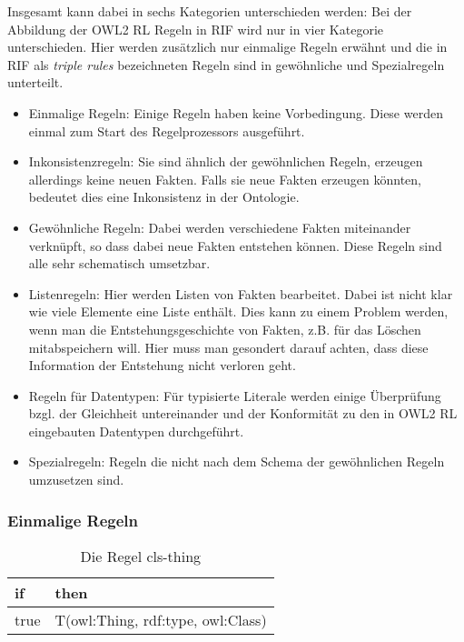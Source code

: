 Insgesamt kann dabei in sechs Kategorien unterschieden werden:
Bei der Abbildung der OWL2 RL Regeln in RIF \cite{Reynolds2009} wird nur in vier Kategorie unterschieden. Hier werden zusätzlich nur einmalige Regeln erwähnt und die in RIF als \emph{triple rules} bezeichneten Regeln sind in gewöhnliche und Spezialregeln unterteilt.
\begin{itemize}
  \item Einmalige Regeln: Einige Regeln haben keine Vorbedingung. Diese werden einmal zum Start des Regelprozessors ausgeführt.
  \item Inkonsistenzregeln: Sie sind ähnlich der gewöhnlichen Regeln, erzeugen allerdings keine neuen Fakten. Falls sie neue Fakten erzeugen könnten, bedeutet dies eine Inkonsistenz in der Ontologie.
  \item Gewöhnliche Regeln: Dabei werden verschiedene Fakten miteinander verknüpft, so dass dabei neue Fakten entstehen können. Diese Regeln sind alle sehr schematisch umsetzbar.
  \item Listenregeln: Hier werden Listen von Fakten bearbeitet. Dabei ist nicht klar wie viele Elemente eine Liste enthält. Dies kann zu einem Problem werden, wenn man die Entstehungsgeschichte von Fakten, z.B. für das Löschen mitabspeichern will. Hier muss man gesondert darauf achten, dass diese Information der Entstehung nicht verloren geht.
  \item Regeln für Datentypen: Für typisierte Literale werden einige Überprüfung bzgl. der Gleichheit untereinander und der Konformität zu den in OWL2 RL eingebauten Datentypen durchgeführt.
  \item Spezialregeln: Regeln die nicht nach dem Schema der gewöhnlichen Regeln umzusetzen sind.

\end{itemize}

\subsubsection{Einmalige Regeln}

\begin{table}[htb]
\begin{center}
	\begin{tabular}{l|l}
	if & then \\ \hline
	true & T(owl:Thing, rdf:type, owl:Class)
	\end{tabular}
\end{center}
	\caption{Die Regel cls-thing}
	\label{rule-cls-thing}
\end{table}


